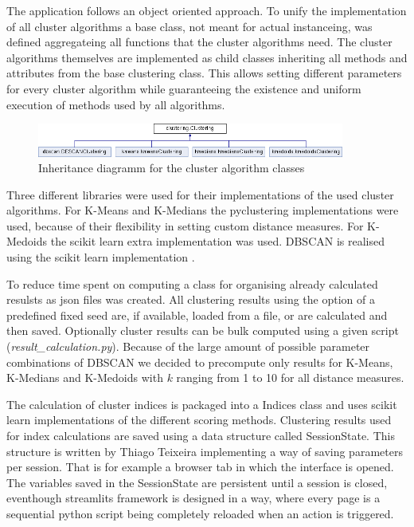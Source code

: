 The application follows an object oriented approach. To unify the implementation of all cluster algorithms a base class, not meant for actual instanceing, was defined aggregateing all functions that the cluster algorithms need.
The cluster algorithms themselves are implemented as child classes inheriting all methods and attributes from the base clustering class. This allows setting different parameters for every cluster algorithm while guaranteeing the existence and uniform execution of methods used by all algorithms.

\begin{figure}[H]
    \centering
    \includegraphics[width=0.9\textwidth]{../docs/html/classclustering_1_1Clustering}
    \caption{Inheritance diagramm for the cluster algorithm classes}
\end{figure}

Three different libraries were used for their implementations of the used cluster algorithms. 
For K-Means and K-Medians the pyclustering \cite{Novikov2019} implementations were used, because of their flexibility in setting custom distance measures. For K-Medoids the scikit learn extra \cite{scikit-learn-extra} implementation was used.
DBSCAN is realised using the scikit learn implementation \cite{scikitlearn}.

To reduce time spent on computing a class for organising already calculated resulsts as json files was created. All clustering results using the option of a predefined fixed seed are, if available, loaded from a file, or are calculated and then saved. Optionally cluster results can be bulk computed using a given script (\textit{result\_calculation.py}). Because of the large amount of possible parameter combinations of DBSCAN we decided to precompute only results for K-Means, K-Medians and K-Medoids with $k$ ranging from 1 to 10 for all distance measures.

The calculation of cluster indices is packaged into a Indices class and uses scikit learn implementations of the different scoring methods. Clustering results used for index calculations are saved using a data structure called SessionState. This structure is written by Thiago Teixeira \cite{sessionstate} implementing a way of saving parameters per session. That is for example a browser tab in which the interface is opened. The variables saved in the SessionState are persistent until a session is closed, eventhough streamlits framework is designed in a way, where every page is a sequential python script being completely reloaded when an action is triggered. 

